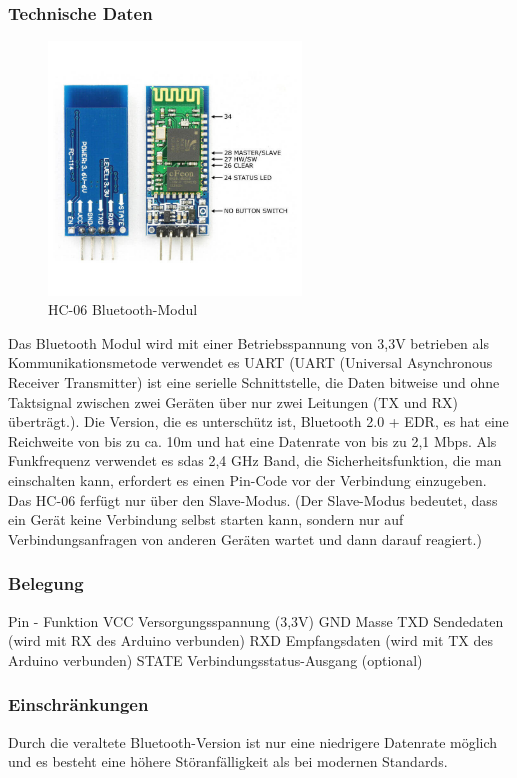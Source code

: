 \subsubsection{Technische Daten}
\begin{figure}[H]
    \centering
    \includegraphics[width=0.6\textwidth]{img/Hardware/hc06.png}
    \caption{HC-06 Bluetooth-Modul}
    \label{fig:hc06}
\end{figure}
Das Bluetooth Modul wird mit einer Betriebsspannung von 3,3V betrieben als Kommunikationsmetode verwendet es UART 
(UART (Universal Asynchronous Receiver Transmitter) ist eine serielle Schnittstelle, die Daten bitweise und ohne Taktsignal zwischen zwei Geräten über nur zwei Leitungen (TX und RX) überträgt.).  
Die Version, die es unterschütz ist, Bluetooth 2.0 + EDR, es hat eine Reichweite von bis zu ca.  10m und hat eine Datenrate von bis zu 2,1 Mbps. 
Als Funkfrequenz verwendet es sdas 2,4 GHz Band, die Sicherheitsfunktion, die man einschalten kann, erfordert es einen Pin-Code vor der Verbindung einzugeben. 
Das HC-06 ferfügt nur über den Slave-Modus. 
(Der Slave-Modus bedeutet, dass ein Gerät keine Verbindung selbst starten kann, sondern nur auf Verbindungsanfragen von anderen Geräten wartet und dann darauf reagiert.)
\subsubsection{Belegung}
Pin	-	Funktion
VCC	Versorgungsspannung (3,3V)
GND	Masse
TXD	Sendedaten (wird mit RX des Arduino verbunden)
RXD	Empfangsdaten (wird mit TX des Arduino verbunden)
STATE	Verbindungsstatus-Ausgang (optional)

\subsubsection{Einschränkungen}
Durch die veraltete Bluetooth-Version ist nur eine niedrigere Datenrate möglich und es besteht eine höhere Störanfälligkeit als bei modernen Standards.
%
